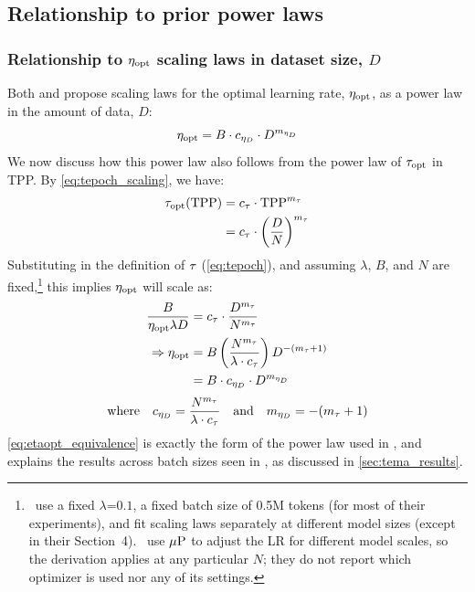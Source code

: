 \subsection{Relationship to prior power laws}

\subsubsection{Relationship to $\eta_{\text{opt}}$ scaling laws in dataset size, $D$}\label{sec:eta_scaling}

Both \citet{shen2024power} and \citet{bjorck2024scaling} propose
scaling laws for the optimal learning rate, $\eta_{\text{opt}}$, as a power law
in the amount of data, $D$:
\begin{equation*}
  \eta_{\text{opt}} = B \cdot c_{\eta_D} \cdot D^{m_{\eta_D}}
\end{equation*}
We now discuss how this power law also follows from the power law of
${\tau}_{\text{opt}}$ in TPP\@.  By \cref{eq:tepoch_scaling}, we have:
\begin{align*}
  {\tau}_{\text{opt}}(\mathrm{TPP}) &= {c_{\tau}} \cdot \mathrm{TPP}^{m_{\tau}} \\
  &= {c_{\tau}} \cdot \left( \frac{D}{N} \right)^{m_{\tau}}
\end{align*}
Substituting in the definition of $\tau$ (\cref{eq:tepoch}), and
assuming $\lambda$, $B$, and $N$ are
fixed,\footnote{\citet{bjorck2024scaling}\ use a fixed
$\lambda$=$0.1$, a fixed batch size of 0.5M tokens (for most of their
experiments), and fit scaling laws separately at different model sizes
(except in their Section~4).  \citet{shen2024power}\ use $\mbox{$\mu$P}$ to
adjust the LR for different model scales, so the derivation applies at
any particular $N$; they do not report which optimizer is used nor any
of its settings.} this implies $\eta_{\text{opt}}$ will scale as:
\begin{align}\label{eq:etaopt_equivalence}
  \frac{B}{\eta_{\text{opt}}\lambda D} &= {c_{\tau}} \cdot \frac{D^{m_{\tau}}}{N^{m_{\tau}}} \notag \\
  \Rightarrow \eta_{\text{opt}} &= B \left( \frac{N^{m_{\tau}}}{\lambda \cdot c_{\tau}} \right) D^{-(m_{\tau} + 1)} \notag \\
  &= B \cdot c_{\eta_D} \cdot D^{m_{\eta_D}}
\end{align}
\begin{equation*}
  \text{where} \quad 
  c_{\eta_D} = \frac{N^{m_{\tau}}}{\lambda \cdot c_{\tau}}
  \quad \text{and} \quad
  m_{\eta_D} = -(m_{\tau} + 1)
\end{equation*}
\cref{eq:etaopt_equivalence} is exactly the form of the power law used
in \citet{shen2024power}, and explains the results across batch sizes
seen in \citet{bjorck2024scaling}, as discussed in
\cref{sec:tema_results}.

